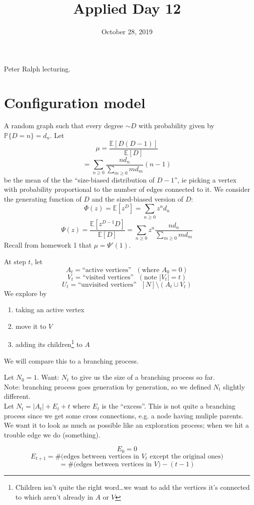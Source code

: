 \documentclass[12pt]{article}
\title{Applied Day 12}
\date{October 28, 2019}
\begin{document}
\maketitle
Peter Ralph lecturing.
\section{Configuration model}
A random graph such that every degree $\sim D$ with probability given by $\mathbb P\{D=n\}= d_n$. Let $$\mu = \dfrac{\mathbb E[D(D-1)]}{\mathbb E[D]}$$
$$=\sum_{n\geq 0} \dfrac{n d_n}{\sum_{m\geq 0}md_m} (n-1)
$$be the mean of the the ``size-biased distribution of $D-1$'', ie picking a vertex with probability proportional to the number of edges connected to it. We consider the generating function of $D$ and the sized-biased version of $D$:
$$\Phi(z) = \mathbb E[z^D] = \sum_{n\geq 0} z^n d_n
$$
$$\Psi(z) = \dfrac{\mathbb E[z^{D-1}D]}{\mathbb E[D]}=\sum_{n\geq 0}z^n \dfrac{nd_n}{\sum_{m\geq 0}md_m}
$$
Recall from homework 1 that $\mu = \Psi'(1)$.

At step $t$, let $$A_t = \text{``active vertices''}\,\,\,\,(\text{where }A_0=0)$$
$$V_t = \text{``visited vertices''}\,\,\,\, (\text{note }|V_t|=t)$$
$$U_t = \text{``unvisited vertices''}\,\,\,\,[N]\setminus(A_t\cup V_t)$$
We explore by
\begin{enumerate}
    \item taking an active vertex
    \item move it to $V$
    \item adding its children\footnote{Children isn't quite the right word\ldots we want to add the vertices it's connected to which aren't already in $A$ or $V$} to $A$
\end{enumerate}
We will compare this to a branching process.

Let $N_0=1$. Want: $N_t$ to give us the size of a branching process so far.\\

\noindent Note: branching process goes generation by generation, so we defined $N_t$ slightly different.\\

\noindent Let $N_t=|A_t| + E_t+t$ where $E_t$ is the ``excess''. This is not quite a branching process since we get some cross connections, e.g. a node having muliple parents. We want it to look as much as possible like an exploration process; when we hit a trouble edge we do (something).

$$E_0 = 0$$
$$E_{t+1} = \text{\#(edges between vertices in $V_t$ except the original ones)}$$
$$=\text{\#(edges between vertices in $V)-(t-1)$}
$$
\end{document}
